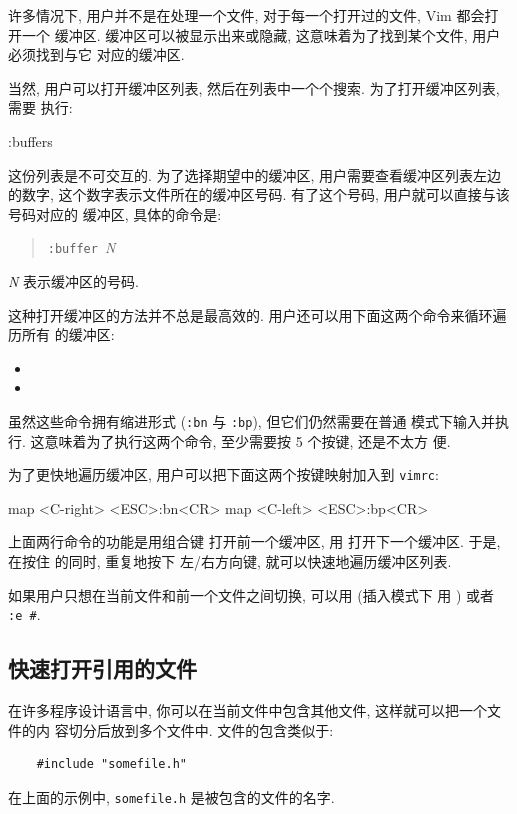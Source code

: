 许多情况下, 用户并不是在处理一个文件, 对于每一个打开过的文件, Vim 都会打开一个
缓冲区. 缓冲区可以被显示出来或隐藏, 这意味着为了找到某个文件, 用户必须找到与它
对应的缓冲区.

当然, 用户可以打开缓冲区列表, 然后在列表中一个个搜索. 为了打开缓冲区列表, 需要 
执行:
\begin{vimcmd}
:buffers
\end{vimcmd}

这份列表是不可交互的. 为了选择期望中的缓冲区, 用户需要查看缓冲区列表左边的数字,
这个数字表示文件所在的缓冲区号码. 有了这个号码, 用户就可以直接与该号码对应的
缓冲区, 具体的命令是:
\begin{quotation}
\texttt{:buffer }\textit{N}
\end{quotation}
\textit{N} 表示缓冲区的号码.

这种打开缓冲区的方法并不总是最高效的. 用户还可以用下面这两个命令来循环遍历所有
的缓冲区:
\begin{itemize}
    \item {}
    \item {}
\end{itemize}

虽然这些命令拥有缩进形式 (\texttt{:bn} 与 \texttt{:bp}), 但它们仍然需要在普通
模式下输入并执行. 这意味着为了执行这两个命令, 至少需要按 5 个按键, 还是不太方
便.

为了更快地遍历缓冲区, 用户可以把下面这两个按键映射加入到 \texttt{vimrc}:
\begin{vimcmd}
map <C-right> <ESC>:bn<CR>
map <C-left> <ESC>:bp<CR>
\end{vimcmd}
上面两行命令的功能是用组合键  打开前一个缓冲区, 用
 打开下一个缓冲区. 于是, 在按住  的同时, 重复地按下
左/右方向键, 就可以快速地遍历缓冲区列表.

\begin{warning}
    如果用户只想在当前文件和前一个文件之间切换, 可以用  (插入模式下
    用  ) 或者 \texttt{:e #}.
\end{warning}

\subsection{快速打开引用的文件}
\label{subsec:open_referenced_files_faster}

在许多程序设计语言中, 你可以在当前文件中包含其他文件, 这样就可以把一个文件的内
容切分后放到多个文件中. 文件的包含类似于:
\begin{verbatim}
    #include "somefile.h"
\end{verbatim}
在上面的示例中, \texttt{somefile.h} 是被包含的文件的名字.

